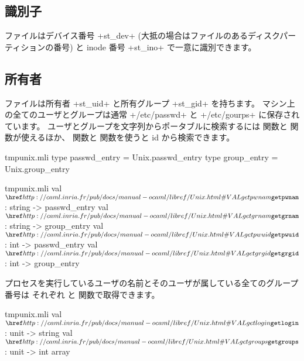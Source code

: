 \subsection*{識別子}

ファイルはデバイス番号 \ml+st_dev+ (大抵の場合はファイルのあるディスクパーティションの番号) と
inode 番号 \ml+st_ino+ で一意に識別できます。

\subsection*{所有者}

ファイルは所有者 \ml+st_uid+ と所有グループ \ml+st_gid+ を持ちます。
マシン上の全てのユーザとグループは通常 \ml+/etc/passwd+ と \ml+/etc/gourps+ に保存されています。
ユーザとグループを文字列からポータブルに検索するには  関数と  関数が使えるほか、
 関数と  関数を使うと id から検索できます。
%
\begin{codefile}{tmpunix.mli}
type passwd_entry = Unix.passwd_entry
type group_entry = Unix.group_entry
\end{codefile}
%
\begin{listingcodefile}{tmpunix.mli}
val $\libvalue{Unix}{getpwnam}$ : string -> passwd_entry
val $\libvalue{Unix}{getgrnam}$ : string -> group_entry
val $\libvalue{Unix}{getpwuid}$ : int -> passwd_entry
val $\libvalue{Unix}{getgrgid}$ : int -> group_entry
\end{listingcodefile}

プロセスを実行しているユーザの名前とそのユーザが属している全てのグループ番号は
それぞれ  と  関数で取得できます。
%
\begin{listingcodefile}{tmpunix.mli}
val $\libvalue{Unix}{getlogin}$ : unit -> string
val $\libvalue{Unix}{getgroups}$ : unit -> int array
\end{listingcodefile}

